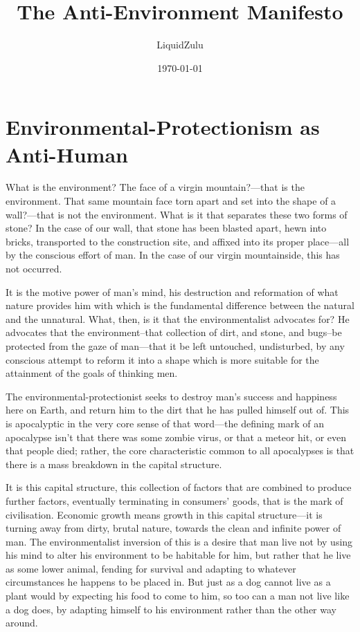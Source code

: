 \documentclass[11pt]{article}
\author{LiquidZulu}
\date{\today}
\title{The Anti-Environment Manifesto}
\begin{document}
\maketitle
\tableofcontents



\section{Environmental-Protectionism as Anti-Human}
\label{sec:orgc2d2787}
What is the environment? The face of a virgin mountain?---that is the environment. That same mountain face torn apart and set into the shape of a wall?---that is not the environment. What is it that separates these two forms of stone? In the case of our wall, that stone has been blasted apart, hewn into bricks, transported to the construction site, and affixed into its proper place---all by the conscious effort of man. In the case of our virgin mountainside, this has not occurred.

It is the motive power of man's mind, his destruction and reformation of what nature provides him with which is the fundamental difference between the natural and the unnatural. What, then, is it that the environmentalist advocates for? He advocates that the environment--that collection of dirt, and stone, and bugs--be protected from the gaze of man---that it be left untouched, undisturbed, by any conscious attempt to reform it into a shape which is more suitable for the attainment of the goals of thinking men.

The environmental-protectionist seeks to destroy man's success and happiness here on Earth, and return him to the dirt that he has pulled himself out of. This is apocalyptic in the very core sense of that word---the defining mark of an apocalypse isn't that there was some zombie virus, or that a meteor hit, or even that people died; rather, the core characteristic common to all apocalypses is that there is a mass breakdown in the capital structure.

It is this capital structure, this collection of factors that are combined to produce further factors, eventually terminating in consumers' goods, that is the mark of civilisation. Economic growth means growth in this capital structure---it is turning away from dirty, brutal nature, towards the clean and infinite power of man. The environmentalist inversion of this is a desire that man live not by using his mind to alter his environment to be habitable for him, but rather that he live as some lower animal, fending for survival and adapting to whatever circumstances he happens to be placed in. But just as a dog cannot live as a plant would by expecting his food to come to him, so too can a man not live like a dog does, by adapting himself to his environment rather than the other way around.
\end{document}
